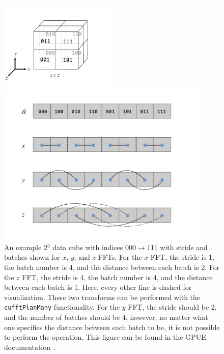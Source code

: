 \begin{figure}
\center \includegraphics[width=0.5\textwidth]{data/gpu/fft/fft_fig.png}

\center \includegraphics[width=0.9\textwidth]{data/gpu/fft/fft_fig2.png}

\caption{An example 2$^3$ data cube with indices 000$\rightarrow$111 with stride and batches shown for $x$, $y$, and $z$ FFTs.
For the $x$ FFT, the stride is 1, the batch number is 4, and the distance between each batch is 2.
For the $z$ FFT, the stride is 4, the batch number is 4, and the distance between each batch is 1.
Here, every other line is dashed for visualization.
These two transforms can be performed with the \texttt{cufftPlanMany} functionality.
For the $y$ FFT, the stride should be 2, and the number of batches should be 4; however, no matter what one specifies the distance between each batch to be, it is not possible to perform the operation.
This figure can be found in the GPUE documentation~\cite{docs}.
}
\label{fig:FFTopt}
\end{figure}

